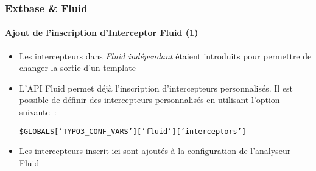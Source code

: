 \begin{frame}[fragile]
	\frametitle{Extbase \& Fluid}
	\framesubtitle{Ajout de l'inscription d'Interceptor Fluid (1)}

	\lstset{basicstyle=\tiny\ttfamily}

	\begin{itemize}

		\item Les intercepteurs dans \textit{Fluid indépendant} étaient introduits pour permettre de changer la sortie d'un template

		\item L'API Fluid permet déjà l'inscription d'intercepteurs personnalisés.
			Il est possible de définir des intercepteurs personnalisés en utilisant l'option suivante~:

			\small
				\texttt{\$GLOBALS['TYPO3\_CONF\_VARS']['fluid']['interceptors']}
			\normalsize

		\item Les intercepteurs inscrit ici sont ajoutés à la configuration de l'analyseur Fluid

	\end{itemize}

\end{frame}

